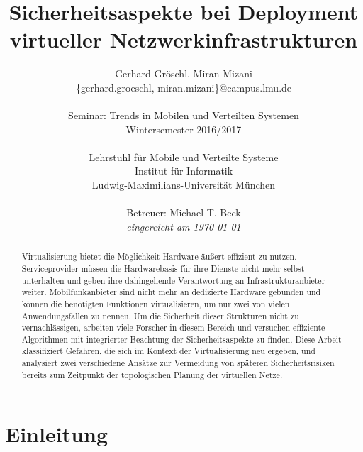 \documentclass{lni}
\author{Gerhard Gröschl, Miran Mizani\\\{gerhard.groeschl, miran.mizani\}@campus.lmu.de\\\\
Seminar: Trends in Mobilen und Verteilten Systemen \\Wintersemester 2016/2017\\\\
Lehrstuhl für Mobile und Verteilte Systeme\\Institut für Informatik\\Ludwig-Maximilians-Universität München\\\\
Betreuer: Michael T. Beck\\\textit{eingereicht am \today}}
\title{Sicherheitsaspekte bei Deployment virtueller Netzwerkinfrastrukturen}
\begin{document}
\maketitle

\vfill

\begin{abstract}
	Virtualisierung bietet die Möglichkeit Hardware äußert effizient zu nutzen. Serviceprovider müssen die Hardwarebasis für ihre Dienste nicht mehr selbst unterhalten und geben ihre dahingehende Verantwortung an Infrastrukturanbieter weiter. Mobilfunkanbieter sind nicht mehr an dedizierte Hardware gebunden und können die benötigten Funktionen virtualisieren, um nur zwei von vielen Anwendungsfällen zu nennen. Um die Sicherheit dieser Strukturen nicht zu vernachlässigen, arbeiten viele Forscher in diesem Bereich und versuchen effiziente Algorithmen mit integrierter Beachtung der Sicherheitsaspekte zu finden. Diese Arbeit klassifiziert Gefahren, die sich im Kontext der Virtualisierung neu ergeben, und analysiert zwei verschiedene Ansätze zur Vermeidung von späteren Sicherheitsrisiken bereits zum Zeitpunkt der topologischen Planung der virtuellen Netze. 
\end{abstract}


\newpage
\tableofcontents
\newpage

\section{Einleitung}
\label{sec:Einleitung}





\end{document}
